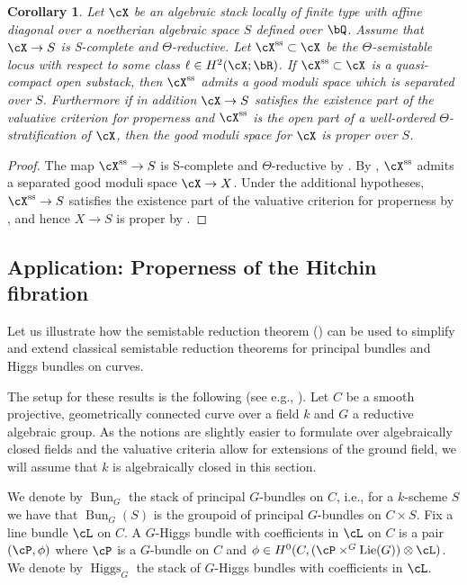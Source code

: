 \documentclass[a4paper]{amsart}
\numberwithin{equation}{section}
\theoremstyle{plain}
\newtheorem{cor}[thm]{Corollary}
\theoremstyle{definition}
\DeclareMathOperator{\Bun}{Bun}
\newcommand{\tensor}{\otimes}
\renewcommand{\ss}{{\rm ss}}
\DeclareMathOperator{\Lie}{Lie}
\DeclareMathOperator{\Higgs}{Higgs}
\begin{document}
\begin{cor} \label{P:moduli_space_semistable_locus}
Let $\cX$ be an algebraic stack locally of finite type with affine diagonal over a noetherian algebraic space $S$ defined over $\bQ$. Assume that $\cX \to S$ is  {\textsf{S}}-complete and $\Theta$-reductive. Let $\cX^{\ss} \subset \cX$ be the $\Theta$-semistable locus with respect to some class $\ell \in H^2(\cX;\bR)$. If $\cX^{\ss} \subset \cX$ is a quasi-compact open substack, then $\cX^{\ss}$ admits a good moduli space which is separated over $S$. Furthermore if in addition $\cX \to S$ satisfies the existence part of the valuative criterion for properness and $\cX^{\ss}$ is the open part of a well-ordered $\Theta$-stratification of $\cX$, then the good moduli space for $\cX$ is proper over $S$.
\end{cor}
\begin{proof}
The map $\cX^{\ss} \to S$ is  {\textsf{S}}-complete and $\Theta$-reductive by .  
By , $\cX^{\ss}$ admits a separated good moduli space $\cX \to X$. Under the additional hypotheses, $\cX^{\ss} \to S$ satisfies the existence part of the valuative criterion for properness by , and hence $X \to S$ is proper by .
\end{proof}


\subsection{Application: Properness of the Hitchin fibration}


Let us illustrate how the semistable reduction theorem () can be used to simplify and extend classical semistable reduction theorems for principal bundles and Higgs bundles on curves. 

The setup for these results is the following (see e.g., \cite[\S 2]{NgoHitchin}). Let $C$ be a smooth projective, geometrically connected curve over a field $k$ and $G$ a reductive algebraic group. As the notions are slightly easier to formulate over algebraically closed fields and the valuative criteria allow for extensions of the ground field, we will assume that $k$ is algebraically closed in this section. 

We denote by $\Bun_G$ the stack of principal $G$-bundles on $C$, i.e., for a $k$-scheme $S$ we have that $\Bun_G(S)$ is the groupoid of principal $G$-bundles on $C\times S$. Fix a line bundle $\cL$ on $C$. A $G$-Higgs bundle with coefficients in $\cL$ on $C$ is a pair $(\cP,\phi)$ where $\cP$ is a $G$-bundle on $C$ and $\phi\in H^0(C,(\cP\times^G \Lie(G))\tensor \cL)$. We denote by $\Higgs_G$ the stack of $G$-Higgs bundles with coefficients in $\cL$.
\end{document}
